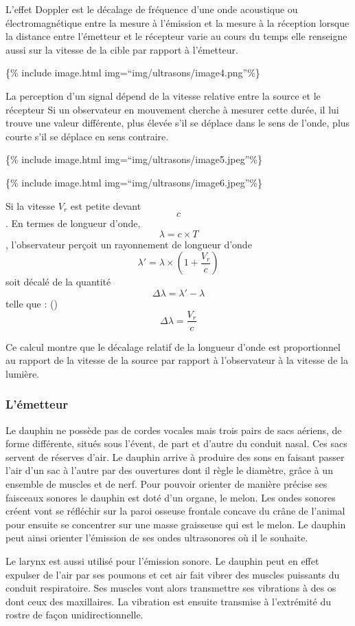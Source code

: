 L'effet Doppler est le décalage de fréquence d'une onde acoustique ou
électromagnétique entre la mesure à l'émission et la mesure à la
réception lorsque la distance entre l'émetteur et le récepteur varie au
cours du temps elle renseigne aussi sur la vitesse de la cible par
rapport à l'émetteur.

\{\% include image.html img=``img/ultrasons/image4.png''\%\}

La perception d'un signal dépend de la vitesse relative entre la source
et le récepteur Si un observateur en mouvement cherche à mesurer cette
durée, il lui trouve une valeur différente, plus élevée s'il se déplace
dans le sens de l'onde, plus courte s'il se déplace en sens contraire.

\{\% include image.html img=``img/ultrasons/image5.jpeg''\%\}

\{\% include image.html img=``img/ultrasons/image6.jpeg''\%\}

Si la vitesse \(V_r\) est petite devant \[c\]. En termes de longueur
d'onde, \[\lambda = c \times T\], l'observateur perçoit un rayonnement
de longueur d'onde
\[\lambda\prime = \lambda \times (1 + \frac{V_r}{c})\] soit décalé de la
quantité \[\Delta\lambda = \lambda\prime - \lambda\] telle que :
()
\[\Delta\lambda = \frac{V_r}{c}\]

Ce calcul montre que le décalage relatif de la longueur d'onde est
proportionnel au rapport de la vitesse de la source par rapport à
l'observateur à la vitesse de la lumière.

\subsubsection{L'émetteur}\label{luxe9metteur}

Le dauphin ne possède pas de cordes vocales mais trois pairs de sacs
aériens, de forme différente, situés sous l'évent, de part et d'autre du
conduit nasal. Ces sacs servent de réserves d'air. Le dauphin arrive à
produire des sons en faisant passer l'air d'un sac à l'autre par des
ouvertures dont il règle le diamètre, grâce à un ensemble de muscles et
de nerf. Pour pouvoir orienter de manière précise ses faisceaux sonores
le dauphin est doté d'un organe, le melon. Les ondes sonores créent vont
se réfléchir sur la paroi osseuse frontale concave du crâne de l'animal
pour ensuite se concentrer sur une masse graisseuse qui est le melon. Le
dauphin peut ainsi orienter l'émission de ses ondes ultrasonores où il
le souhaite.

Le larynx est aussi utilisé pour l'émission sonore. Le dauphin peut en
effet expulser de l'air par ses poumons et cet air fait vibrer des
muscles puissants du conduit respiratoire. Ses muscles vont alors
transmettre ses vibrations à des os dont ceux des maxillaires. La
vibration est ensuite transmise à l'extrémité du rostre de façon
unidirectionnelle.

